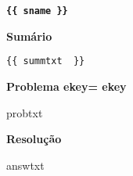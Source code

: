 \documentclass{article}
\begin{document}
{\centering\bf \verb"{{ sname }}" }

\noindent\textbf{Sum\'ario}

\begin{verbatim}
{{ summtxt  }}
\end{verbatim}

\noindent\textbf{Problema ekey={{ ekey }} }

{{ probtxt }} 

\noindent\textbf{Resolu\c c\~ao}

{{ answtxt  }}
\end{document}
